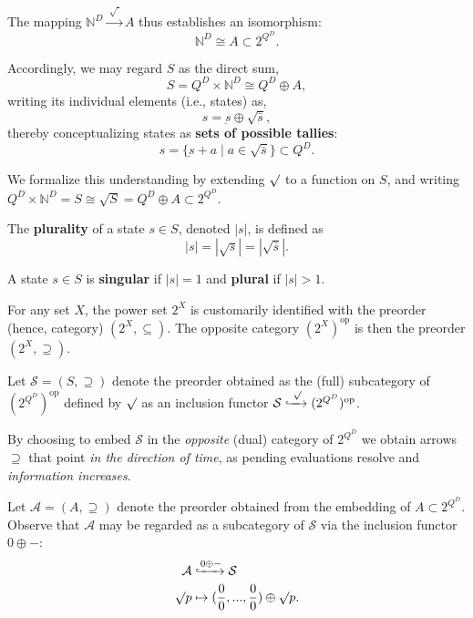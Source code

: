 \documentclass{article}
\newcommand{\N}{\mathbb{N}}
\DeclareMathOperator{\dual}{op}
\begin{document}
\begin{fact}
  The mapping $\N^D \xrightarrow{\;\surd\;} A$ thus establishes an isomorphism:
  $$
  \N^D \cong A \subset 2^{Q^D}.
  $$
\end{fact}

\begin{fact}
  Accordingly, we may regard $S$ as the direct sum,
  $$
  S = Q^D \times \N^D \cong Q^D \oplus A,
  $$
  writing its individual elements (i.e., states) as,
  $$
  s = \underbar{s} \oplus \surd \bar{s},
  $$
  thereby conceptualizing states as \textbf{sets of possible tallies}:
  $$
  s = \{ \underbar{s} + a \mid a \in \surd \bar{s} \} \subset Q^D.
  $$
\end{fact}

\begin{nota}
  We formalize this understanding by extending $\surd$ to a function on $S$, and writing $Q^D \times \N^D = S \cong \surd S = Q^D \oplus A \subset 2^{Q^D}$.
\end{nota}

\begin{defn}
  The \textbf{plurality} of a state $s \in S$, denoted $|s|$, is defined as
  $$
  |s| = |\surd s| = |\surd\bar{s}|.
  $$
\end{defn}

\begin{defn}
  A state $s \in S$ is \textbf{singular} if $|s|=1$ and \textbf{plural} if $|s|>1$.
\end{defn}

\begin{nota}
  For any set $X$, the power set $2^X$ is customarily identified with the preorder (hence, category) $(2^X, \subseteq)$.  The opposite category $(2^X)^{\dual}$ is then the preorder $(2^X, \supseteq)$.
\end{nota}

\begin{nota}
  Let $\mathcal{S} = (S,\supseteq)$ denote the preorder obtained as the (full) subcategory of $(2^{Q^D})^{\dual}$ defined by $\surd$ as an inclusion functor $\mathcal{S} \xhookrightarrow{\;\surd\;} (2^{Q^D})^{\dual}$.
\end{nota}

By choosing to embed $\mathcal{S}$ in the {\em opposite} (dual) category of $2^{Q^D}$ we obtain arrows $\supseteq$ that point {\em in the direction of time}, as pending evaluations resolve and {\em information increases}.

\begin{nota}
  Let $\mathcal{A} = (A,\supseteq)$ denote the preorder obtained from the embedding of $A \subset 2^{Q^D}$.  Observe that $\mathcal{A}$ may be regarded as a subcategory of $\mathcal{S}$ via the inclusion functor $0 \oplus -$:
  \begin{align}
    \mathcal{A} & \xhookrightarrow{0 \oplus -} \mathcal{S} \\
    \surd p & \mapsto (\frac{0}{0},...,\frac{0}{0}) \oplus \surd p.
  \end{align}
\end{nota}
\end{document}
